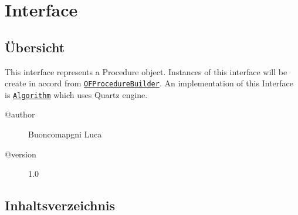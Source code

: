 
\section[OFProcedureInterface]{Interface }\label{ontologyFramework.OFProcedureManagment.OFProcedureInterface-class}
\subsection{Übersicht}
This interface represents a Procedure object.
 Instances of this interface will be create in accord
 from \texttt{\hyperlink{ontologyFramework.OFProcedureManagment.OFProcedureBuilder-class}{OFProcedureBuilder}}.
 An implementation of this Interface is \texttt{\hyperlink{ontologyFramework.OFProcedureManagment.Algorithm-class}{Algorithm}}
 which uses Quartz engine.
\begin{description}
\item[@author] 
Buoncomapgni Luca
\item[@version] 
1.0
\end{description}
\subsection{Inhaltsverzeichnis}
